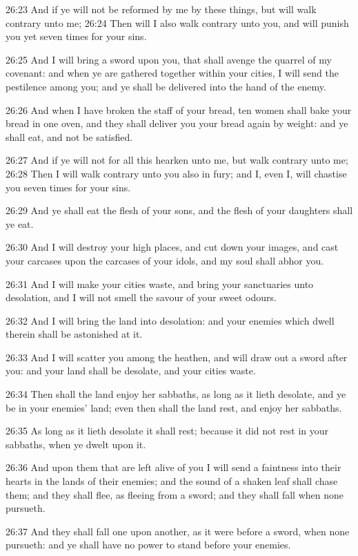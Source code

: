 26:23 And if ye will not be reformed by me by these things, but will walk contrary unto me; 26:24 Then will I also walk contrary unto you, and will punish you yet seven times for your sins.

26:25 And I will bring a sword upon you, that shall avenge the quarrel of my covenant: and when ye are gathered together within your cities, I will send the pestilence among you; and ye shall be delivered into the hand of the enemy.

26:26 And when I have broken the staff of your bread, ten women shall bake your bread in one oven, and they shall deliver you your bread again by weight: and ye shall eat, and not be satisfied.

26:27 And if ye will not for all this hearken unto me, but walk contrary unto me; 26:28 Then I will walk contrary unto you also in fury; and I, even I, will chastise you seven times for your sins.

26:29 And ye shall eat the flesh of your sons, and the flesh of your daughters shall ye eat.

26:30 And I will destroy your high places, and cut down your images, and cast your carcases upon the carcases of your idols, and my soul shall abhor you.

26:31 And I will make your cities waste, and bring your sanctuaries unto desolation, and I will not smell the savour of your sweet odours.

26:32 And I will bring the land into desolation: and your enemies which dwell therein shall be astonished at it.

26:33 And I will scatter you among the heathen, and will draw out a sword after you: and your land shall be desolate, and your cities waste.

26:34 Then shall the land enjoy her sabbaths, as long as it lieth desolate, and ye be in your enemies' land; even then shall the land rest, and enjoy her sabbaths.

26:35 As long as it lieth desolate it shall rest; because it did not rest in your sabbaths, when ye dwelt upon it.

26:36 And upon them that are left alive of you I will send a faintness into their hearts in the lands of their enemies; and the sound of a shaken leaf shall chase them; and they shall flee, as fleeing from a sword; and they shall fall when none pursueth.

26:37 And they shall fall one upon another, as it were before a sword, when none pursueth: and ye shall have no power to stand before your enemies.

